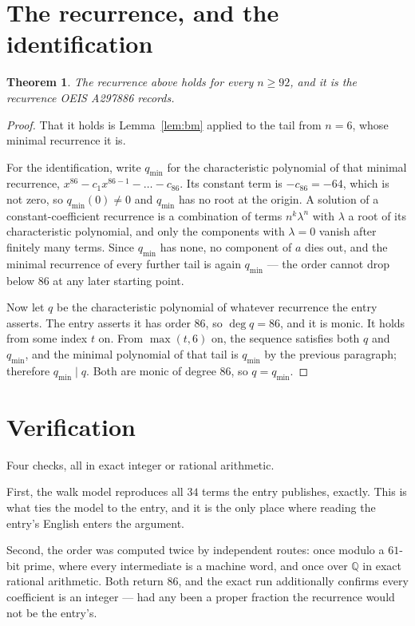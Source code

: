\documentclass[11pt,a4paper]{article}
\theoremstyle{plain}
\newtheorem{theorem}{Theorem}
\theoremstyle{definition}
\begin{document}
\section{The recurrence, and the identification}

\begin{theorem}
The recurrence above holds for every $n\ge92$, and it is the recurrence OEIS A297886 records.
\end{theorem}

\begin{proof}
That it holds is Lemma~\ref{lem:bm} applied to the tail from $n=6$, whose minimal
recurrence it is.

For the identification, write $q_{\min}$ for the characteristic polynomial of that minimal
recurrence, $x^{86}-c_1x^{86-1}-\dots-c_{86}$. Its constant term is
$-c_{86}=-64$, which is not zero, so $q_{\min}(0)\neq0$ and $q_{\min}$ has no
root at the origin. A solution of a constant-coefficient recurrence is a combination of terms
$n^{k}\lambda^{n}$ with $\lambda$ a root of its characteristic polynomial, and only the
components with $\lambda=0$ vanish after finitely many terms. Since $q_{\min}$ has none, no
component of $a$ dies out, and the minimal recurrence of every further tail is again
$q_{\min}$ --- the order cannot drop below $86$ at any later starting point.

Now let $q$ be the characteristic polynomial of whatever recurrence the entry asserts. The
entry asserts it has order $86$, so $\deg q=86$, and it is monic. It holds from some
index $t$ on. From $\max(t,6)$ on, the sequence satisfies both $q$ and $q_{\min}$, and
the minimal polynomial of that tail is $q_{\min}$ by the previous paragraph; therefore
$q_{\min}\mid q$. Both are monic of degree $86$, so $q=q_{\min}$.
\end{proof}

\section{Verification}

Four checks, all in exact integer or rational arithmetic.

First, the walk model reproduces all $34$ terms the entry publishes, exactly. This is
what ties the model to the entry, and it is the only place where reading the entry's English
enters the argument.

Second, the order was computed twice by independent routes: once modulo a $61$-bit prime, where
every intermediate is a machine word, and once over $\mathbb{Q}$ in exact rational arithmetic.
Both return $86$, and the exact run additionally confirms every coefficient is an integer
--- had any been a proper fraction the recurrence would not be the entry's.
\end{document}
